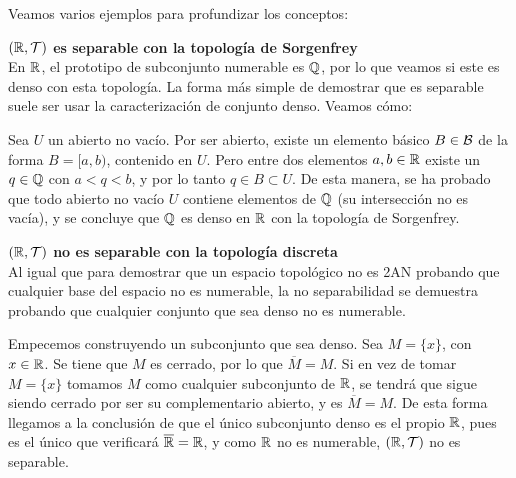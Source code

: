 Veamos varios ejemplos para profundizar los conceptos:

\begin{ejs}
    \item {\bf  $(\mathbb{R}, \mathcal{T})$ es separable con la topología de Sorgenfrey}\\
    En $\mathbb{R}$, el prototipo de subconjunto numerable es $\mathbb{Q}$, por lo que veamos si este es denso con esta topología. La forma más simple de demostrar que es separable suele ser usar la caracterización de conjunto denso. Veamos cómo:
    
    Sea $U$ un abierto no vacío. Por ser abierto, existe un elemento básico $B\in\mathcal{B}$ de la forma $B = [a,b)$, contenido en $U$. Pero entre dos elementos $a,b\in\mathbb{R}$ existe un $q\in\mathbb{Q}$ con $a<q<b$, y por lo tanto $q \in B \subset U$. De esta manera, se ha probado que todo abierto no vacío $U$ contiene elementos de $\mathbb{Q}$ (su intersección no es vacía), y se concluye que $\mathbb{Q}$ es denso en $\mathbb{R}$ con la topología de Sorgenfrey.

    \item {\bf  $(\mathbb{R}, \mathcal{T})$ no es separable con la topología discreta}\\
    Al igual que para demostrar que un espacio topológico no es 2AN probando que cualquier base del espacio no es numerable, la no separabilidad se demuestra probando que cualquier conjunto que sea denso no es numerable.

    Empecemos construyendo un subconjunto que sea denso. Sea $M = \{x\}$, con $x\in\mathbb{R}$. Se tiene que $M$ es cerrado, por lo que $\overline{M} = M$. Si en vez de tomar $M = \{x\}$ tomamos $M$ como cualquier subconjunto de $\mathbb{R}$, se tendrá que sigue siendo cerrado por ser su complementario abierto, y es $\overline{M} = M$. De esta forma llegamos a la conclusión de que el único subconjunto denso es el propio $\mathbb{R}$, pues es el único que verificará $\overline{\mathbb{R}} = \mathbb{R}$, y como $\mathbb{R}$ no es numerable, $(\mathbb{R}, \mathcal{T})$ no es separable.
\end{ejs}


{}

